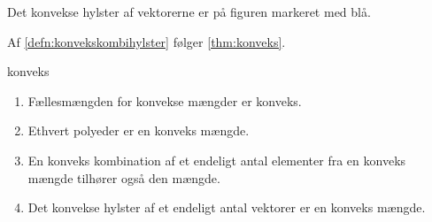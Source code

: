 Det konvekse hylster af vektorerne er på figuren markeret med blå.
%

%
Af \ref{defn:konvekskombihylster} følger \ref{thm:konveks}.
%
\begin{thm}{}{konveks}
\begin{enumerate}[label=(\alph*)]
	\item Fællesmængden for konvekse mængder er konveks. 
	\item Ethvert polyeder er en konveks mængde.
	\item En konveks kombination af et endeligt antal elementer fra en konveks mængde tilhører også den mængde. 
	\item Det konvekse hylster af et endeligt antal vektorer er en konveks mængde. 
\end{enumerate}
\end{thm}
%
%
